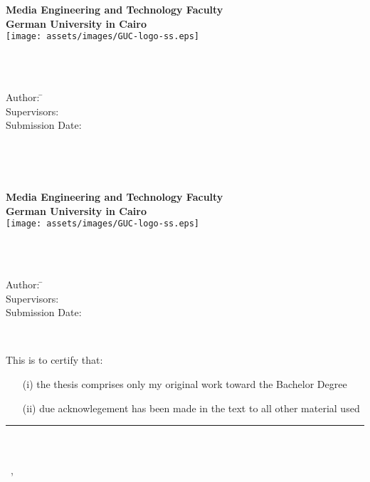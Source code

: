 \newcommand{\titlePage}{

\thispagestyle{empty}
\begin{center}
	\textbf{Media Engineering and Technology Faculty}\\[1mm]
	\textbf{German University in Cairo}\\[1mm]
	\texttt{[image: assets/images/GUC-logo-ss.eps]}

	\vspace{2cm}
	\doublespacing
	{\Huge \textbf{\titleOfThesis}}\\
	\singlespacing
	\vspace{2cm}
	{\large \textbf{\typeOfThesis}}\\

	\vfill
	\parbox{1cm}{
  		\begin{large}
    			\begin{tabbing}
       			Author: \hspace{2cm}
        			\=\authorOfThesis\\[2mm]
      			Supervisors:
        			\>\supervisor\\[2mm]
      			Submission Date:
        			\>\submissionDate\\
    			\end{tabbing}
  		\end{large}
	}\\
\end{center}
\clearpage
}
\titlePage
\thispagestyle{empty}\ \clearpage
\titlePage
\thispagestyle{empty}
This is to certify that:
\begin{itemize}
\item[(i)] the thesis comprises only my original work toward the Bachelor Degree
\item[(ii)] due acknowlegement has been made in the text to all other material used
\end{itemize}

\vspace{2cm}
\begin{flushright}
\rule[0mm]{6cm}{0.2mm}\\
\authorOfThesis\\
\submissionDay~\submissionMonth,~\submissionYear\\
\end{flushright}
\clearpage
